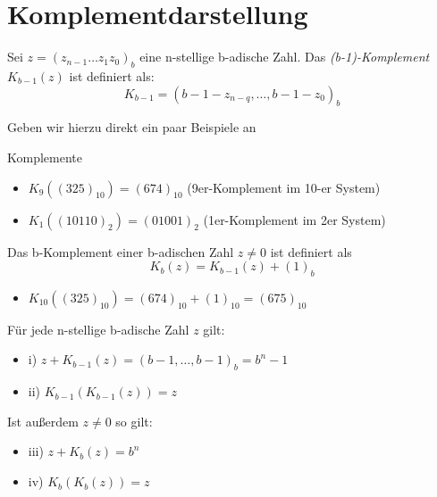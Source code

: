 \section{Komplementdarstellung}

\begin{definition}[(b-1)-Komplement]
Sei $z=(z_{n-1}\ldots z_1 z_0)_b$ eine n-stellige b-adische Zahl. Das \emph{(b-1)-Komplement} $K_{b-1}(z)$ ist definiert als:
\[
K_{b-1} = (b-1-z_{n-q},\ldots, b-1-z_0)_b
\]
\end{definition}
Geben wir hierzu direkt ein paar Beispiele an
\begin{example} Komplemente \\
\begin{itemize}
	\item $K_9((325)_{10})= (674)_{10}$  (9er-Komplement im 10-er System)
	\item $K_1((10110)_2)=(01001)_2$ (1er-Komplement im 2er System)
\end{itemize}
\end{example}
\begin{definition}[b-Komplement]
Das b-Komplement einer b-adischen Zahl $z\neq 0$ ist definiert als \[
K_b(z)=K_{b-1}(z) +(1)_b
\]
\end{definition}
\begin{example}
\begin{itemize}
	\item $K_{10}((325)_{10}) = (674)_{10} + (1)_{10} = (675)_{10}$
\end{itemize}
\end{example}
\begin{lemma}[]
Für jede n-stellige b-adische Zahl $z$ gilt:
\begin{itemize}
	
	\item i) $z+K_{b-1}(z)=(b-1,\ldots,b-1)_b = b^{n}-1$
	\item ii) $K_{b-1}\left( K_{b-1}(z) \right)=z$
\end{itemize}
Ist außerdem $z\neq 0$ so gilt:
\begin{itemize}
	
	\item iii) $z+K_b(z)=b^{n}$
	\item iv) $K_b(K_b(z))=z$
\end{itemize}
\end{lemma}
